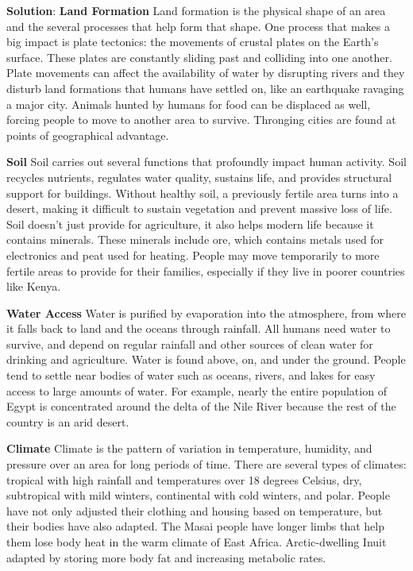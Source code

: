 \documentclass[
  openany]{book}
\newenvironment{solution}{ {\bfseries Solution}:}{}
\begin{document}
\begin{questions}
\begin{solution}
\textbf{Land Formation}
Land formation is the physical shape of an area and the several processes that help form that shape. One process that makes a big impact is plate tectonics: the movements of crustal plates on the Earth's surface. These plates are constantly sliding past and colliding into one another. Plate movements can affect the availability of water by disrupting rivers and they disturb land formations that humans have settled on, like an earthquake ravaging a major city. Animals hunted by humans for food can be displaced as well, forcing people to move to another area to survive. Thronging cities are found at points of geographical advantage.

\textbf{Soil}
Soil carries out several functions that profoundly impact human activity. Soil recycles nutrients, regulates water quality, sustains life, and provides structural support for buildings. Without healthy soil, a previously fertile area turns into a desert, making it difficult to sustain vegetation and prevent massive loss of life. Soil doesn't just provide for agriculture, it also helps modern life because it contains minerals. These minerals include ore, which contains metals used for electronics and peat used for heating. People may move temporarily to more fertile areas to provide for their families, especially if they live in poorer countries like Kenya.

\textbf{Water Access}
Water is purified by evaporation into the atmosphere, from where it falls back to land and the oceans through rainfall. All humans need water to survive, and depend on regular rainfall and other sources of clean water for drinking and agriculture. Water is found above, on, and under the ground. People tend to settle near bodies of water such as oceans, rivers, and lakes for easy access to large amounts of water. For example, nearly the entire population of Egypt is concentrated around the delta of the Nile River because the rest of the country is an arid desert.

\textbf{Climate}
Climate is the pattern of variation in temperature, humidity, and pressure over an area for long periods of time. There are several types of climates: tropical with high rainfall and temperatures over 18 degrees Celsius, dry, subtropical with mild winters, continental with cold winters, and polar. People have not only adjusted their clothing and housing based on temperature, but their bodies have also adapted. The Masai people have longer limbs that help them lose body heat in the warm climate of East Africa. Arctic-dwelling Inuit adapted by storing more body fat and increasing metabolic rates.
\end{solution}


\end{questions}
\end{document}
